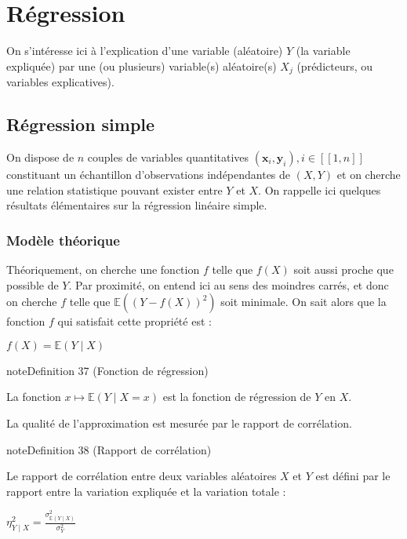 \documentclass[letterpaper,10pt,english]{jupyterBook}
\begin{document}
\chapter{Régression}
\label{\detokenize{regression:regression}}\label{\detokenize{regression::doc}}
\ignorespaces 
\sphinxAtStartPar
On s’intéresse ici à l’explication d’une variable (aléatoire) \(Y\) (la variable expliquée) par une (ou plusieurs) variable(s) aléatoire(s) \(X_j\) (prédicteurs, ou variables explicatives).


\section{Régression simple}
\label{\detokenize{regression:regression-simple}}
\sphinxAtStartPar
On dispose de \(n\) couples de variables quantitatives \((\mathbf x_i,\mathbf y_i),i\in[\![1,n]\!]\) constituant un échantillon d’observations indépendantes de \((X,Y)\) et on cherche une relation statistique pouvant exister entre \(Y\) et \(X\).
On rappelle ici quelques résultats élémentaires sur la régression linéaire simple.


\subsection{Modèle théorique}
\label{\detokenize{regression:modele-theorique}}
\sphinxAtStartPar
Théoriquement, on cherche une fonction \(f\) telle que \(f(X)\) soit aussi proche que possible de \(Y\). Par proximité, on entend ici au sens des moindres carrés, et donc on cherche \(f\) telle que \(\mathbb{E}\left ( (Y-f(X))^2\right )\) soit minimale. On sait alors que la fonction \(f\) qui satisfait cette propriété est :

\sphinxAtStartPar
\(f(X) = \mathbb{E}(Y\mid X)\)
\label{regression:definition-0}
\begin{sphinxadmonition}{note}{Definition 37 (Fonction de régression)}



\sphinxAtStartPar
La fonction \(x\mapsto \mathbb{E}(Y\mid X=x)\) est la fonction de régression de \(Y\) en \(X\).
\end{sphinxadmonition}

\sphinxAtStartPar
La qualité de l’approximation est mesurée par le rapport de corrélation.

\ignorespaces \label{regression:definition-1}
\begin{sphinxadmonition}{note}{Definition 38 (Rapport de corrélation)}



\sphinxAtStartPar
Le rapport de corrélation entre deux variables aléatoires \(X\) et \(Y\) est défini par le rapport entre la variation expliquée et la variation totale :

\sphinxAtStartPar
\(\eta_{Y\mid X}^2 = \frac{\sigma_{\mathbb{E}(Y\mid X)}^2}{\sigma_Y^2}\)
\end{sphinxadmonition}
\end{document}
